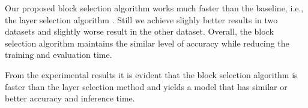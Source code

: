 \documentclass[a4paper,fleqn]{cas-sc}
\begin{document}
\begin{comment}
\begin{table}[width=\linewidth,cols=4,pos=h]
\caption{Transfer learning performance (CIFAR100)}
\label{tbl6}
\begin{tabular*}{\tblwidth}{ c | c | c | c }
\toprule
 & conventional & layers by GA & blocks by GA \\
\midrule
Runtime       & N/A & 1h 34m & 39 mins \\
Training time & 12 mins     & 28 mins     & 19 mins \\
Evaluation time & 32 ms & 31 ms & 31 ms \\
Accuracy    & 0.83    & 0.81    &  0.82  \\
\# Hyper-parameters & 41,35,648 & 2,56,500 & 8,30,758 \\
\bottomrule
\end{tabular*}
\end{table}

\begin{table}[width=\linewidth,cols=4,pos=h]
\caption{Transfer learning performance (MangoLeafBD)}
\label{tbl-mango-tl}
\begin{tabular*}{\tblwidth}{ c | c | c | c }
\toprule
 & conventional & layers by GA & blocks by GA \\
\midrule
Runtime       & N/A & 12m 19s & 2m 42s \\
Training time & 7 mins     & 19 mins     & 18 mins \\
Evaluation time & 117 ms & 58 ms & 99 ms \\
Accuracy    & 0.998    & 1.0    &  0.997  \\
\# Hyper-parameters & 40,17,796 & 3,61,896 & 4,24,784 \\
\bottomrule
\end{tabular*}
\end{table}
\end{comment}

Our proposed block selection algorithm works much faster than the baseline, i.e., the layer selection algorithm \cite{Nagae2022}. Still we achieve slighly better results in two datasets and slightly worse result in the other dataset. Overall, the block selection algorithm maintains the similar level of accuracy while reducing the training and evaluation time.

From the experimental results it is evident that the block selection algorithm is faster than the layer selection method and yields a model that has similar or better accuracy and inference time.
\end{document}
